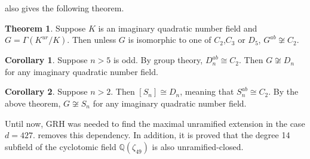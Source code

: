 \documentclass[12pt]{extarticle}
\newcommand{\Q}{\mathbb{Q}}
\newcommand{\<}{\langle}
\renewcommand{\>}{\rangle}
\theoremstyle{definition}
\newtheorem{theorem}{Theorem}
\newtheorem{corollary}{Corollary}
\begin{document}
\cite{YAMAMURA1996} also gives the following theorem. 
\begin{theorem}
Suppose $K$ is an imaginary quadratic number field and $G = \Gamma(K^{ur}/K)$.  Then unless $G$ is isomorphic to one of $C_2$,$C_3$ or $D_5$, $G^{ab} \not \cong C_2$. 
\end{theorem}

\begin{corollary}
Suppose $n>5$ is odd. By group theory, $D_n^{ab} \cong C_2$. Then $G \not \cong D_n$ for any imaginary quadratic number field.
\end{corollary}
\begin{corollary}
Suppose $n>2$. Then $[S_n] \cong D_n$, meaning that $S_n^{ab} \cong C_2$. By the above theorem, $G \not \cong S_n$ for any imaginary quadratic number field.
\end{corollary}
Until now, GRH was needed to find the maximal unramified extension in the case $d = 427$. \cite{WONG} removes this dependency. In addition, it is proved that the degree 14 subfield of the cyclotomic field $\Q(\zeta_49)$ is also unramified-closed. 
\end{document}
